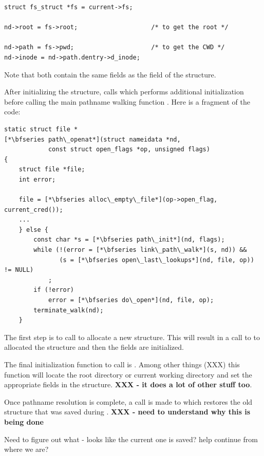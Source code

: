 \begin{lstlisting}
struct fs_struct *fs = current->fs;

nd->root = fs->root;                    /* to get the root */

nd->path = fs->pwd;                     /* to get the CWD */
nd->inode = nd->path.dentry->d_inode;
\end{lstlisting}

\noindent
Note that both contain the same fields as the  field of the  structure.

After initializing the  structure,  calls  which performs additional initialization before calling the main pathname walking function . Here is a fragment of the code:
 
\begin{lstlisting}
static struct file *
[*\bfseries path\_openat*](struct nameidata *nd,
            const struct open_flags *op, unsigned flags)
{   
    struct file *file;
    int error;
        
    file = [*\bfseries alloc\_empty\_file*](op->open_flag, current_cred());
    ...
    } else {
        const char *s = [*\bfseries path\_init*](nd, flags);
        while (!(error = [*\bfseries link\_path\_walk*](s, nd)) &&
               (s = [*\bfseries open\_last\_lookups*](nd, file, op)) != NULL)
            ;
        if (!error)
            error = [*\bfseries do\_open*](nd, file, op);
        terminate_walk(nd);
    }
\end{lstlisting}

\noindent
The first step is to call  to allocate a new  structure. This will result in a call to  to allocated the structure and then the fields are initialized. 

The final initialization function to call is . Among other things (XXX) this function will locate the root directory or current working directory and set the appropriate fields in the  structure. \textbf{XXX - it does a lot of other stuff too}.

Once pathname resolution is complete, a call is made to  which restores the old  structure that was saved during . \textbf{XXX - need to understand why this is being done}

Need to figure out what  - looks like the current one is saved? help continue from where we are?


